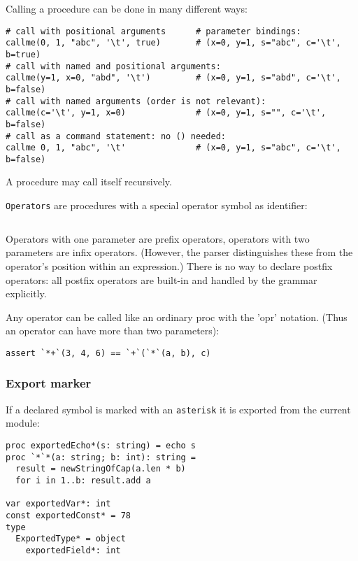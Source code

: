 Calling a procedure can be done in many different ways:

\begin{verbatim}
# call with positional arguments      # parameter bindings:
callme(0, 1, "abc", '\t', true)       # (x=0, y=1, s="abc", c='\t', b=true)
# call with named and positional arguments:
callme(y=1, x=0, "abd", '\t')         # (x=0, y=1, s="abd", c='\t', b=false)
# call with named arguments (order is not relevant):
callme(c='\t', y=1, x=0)              # (x=0, y=1, s="", c='\t', b=false)
# call as a command statement: no () needed:
callme 0, 1, "abc", '\t'              # (x=0, y=1, s="abc", c='\t', b=false)
\end{verbatim}

A procedure may call itself recursively.

\texttt{Operators} are procedures with a special operator symbol as
identifier:

\begin{verbatim}
\end{verbatim}

Operators with one parameter are prefix operators, operators with two
parameters are infix operators. (However, the parser distinguishes these
from the operator's position within an expression.) There is no way to
declare postfix operators: all postfix operators are built-in and
handled by the grammar explicitly.

Any operator can be called like an ordinary proc with the '{opr}'
notation. (Thus an operator can have more than two parameters):

\begin{verbatim}
assert `*+`(3, 4, 6) == `+`(`*`(a, b), c)
\end{verbatim}

\hypertarget{export-marker}{%
\subsubsection{Export marker}\label{export-marker}}

If a declared symbol is marked with an \texttt{asterisk} it is exported
from the current module:

\begin{verbatim}
proc exportedEcho*(s: string) = echo s
proc `*`*(a: string; b: int): string =
  result = newStringOfCap(a.len * b)
  for i in 1..b: result.add a

var exportedVar*: int
const exportedConst* = 78
type
  ExportedType* = object
    exportedField*: int
\end{verbatim}

